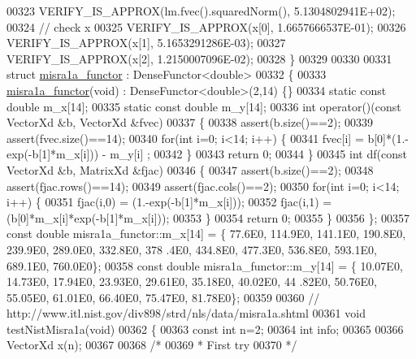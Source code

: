 \begin{DoxyCode}
00323   VERIFY\_IS\_APPROX(lm.fvec().squaredNorm(), 5.1304802941E+02);
00324   \textcolor{comment}{// check x}
00325   VERIFY\_IS\_APPROX(x[0], 1.6657666537E-01);
00326   VERIFY\_IS\_APPROX(x[1], 5.1653291286E-03);
00327   VERIFY\_IS\_APPROX(x[2], 1.2150007096E-02);
00328 \}
00329 
00330 
00331 \textcolor{keyword}{struct }\hyperlink{structmisra1a__functor}{misra1a\_functor} : DenseFunctor<double>
00332 \{
00333     \hyperlink{structmisra1a__functor}{misra1a\_functor}(\textcolor{keywordtype}{void}) : DenseFunctor<double>(2,14) \{\}
00334     \textcolor{keyword}{static} \textcolor{keyword}{const} \textcolor{keywordtype}{double} m\_x[14];
00335     \textcolor{keyword}{static} \textcolor{keyword}{const} \textcolor{keywordtype}{double} m\_y[14];
00336     \textcolor{keywordtype}{int} operator()(\textcolor{keyword}{const} VectorXd &b, VectorXd &fvec)
00337     \{
00338         assert(b.size()==2);
00339         assert(fvec.size()==14);
00340         \textcolor{keywordflow}{for}(\textcolor{keywordtype}{int} i=0; i<14; i++) \{
00341             fvec[i] = b[0]*(1.-exp(-b[1]*m\_x[i])) - m\_y[i] ;
00342         \}
00343         \textcolor{keywordflow}{return} 0;
00344     \}
00345     \textcolor{keywordtype}{int} df(\textcolor{keyword}{const} VectorXd &b, MatrixXd &fjac)
00346     \{
00347         assert(b.size()==2);
00348         assert(fjac.rows()==14);
00349         assert(fjac.cols()==2);
00350         \textcolor{keywordflow}{for}(\textcolor{keywordtype}{int} i=0; i<14; i++) \{
00351             fjac(i,0) = (1.-exp(-b[1]*m\_x[i]));
00352             fjac(i,1) = (b[0]*m\_x[i]*exp(-b[1]*m\_x[i]));
00353         \}
00354         \textcolor{keywordflow}{return} 0;
00355     \}
00356 \};
00357 \textcolor{keyword}{const} \textcolor{keywordtype}{double} misra1a\_functor::m\_x[14] = \{ 77.6E0, 114.9E0, 141.1E0, 190.8E0, 239.9E0, 289.0E0, 332.8E0, 378
      .4E0, 434.8E0, 477.3E0, 536.8E0, 593.1E0, 689.1E0, 760.0E0\};
00358 \textcolor{keyword}{const} \textcolor{keywordtype}{double} misra1a\_functor::m\_y[14] = \{ 10.07E0, 14.73E0, 17.94E0, 23.93E0, 29.61E0, 35.18E0, 40.02E0, 44
      .82E0, 50.76E0, 55.05E0, 61.01E0, 66.40E0, 75.47E0, 81.78E0\};
00359 
00360 \textcolor{comment}{// http://www.itl.nist.gov/div898/strd/nls/data/misra1a.shtml}
00361 \textcolor{keywordtype}{void} testNistMisra1a(\textcolor{keywordtype}{void})
00362 \{
00363   \textcolor{keyword}{const} \textcolor{keywordtype}{int} n=2;
00364   \textcolor{keywordtype}{int} info;
00365 
00366   VectorXd x(n);
00367 
00368   \textcolor{comment}{/*}
00369 \textcolor{comment}{   * First try}
00370 \textcolor{comment}{   */}

\end{DoxyCode}
